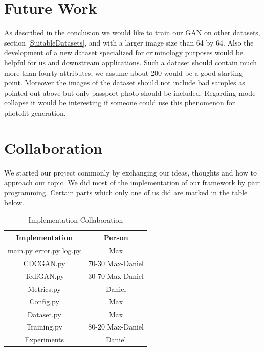 \documentclass[12pt, a4paper]{article}
\begin{document}
\section{Future Work}
As described in the conclusion we would like to train our GAN on other datasets, section \ref{SuitableDatasets}, and with a larger image size than 64 by 64. 
Also the development of a new dataset specialized for criminology purposes would be helpful for us and downstream applications.
Such a dataset should contain much more than fourty attributes, we assume about 200 would be a good starting point. Moreover the images of the dataset should not include bad samples as pointed out above but only passport photo should be included.
Regarding mode collapse it would be interesting if someone could use this phenomenon for photofit generation.
\section{Collaboration}
We started our project commonly by exchanging our ideas, thoughts and how to approach our topic.
We did most of the implementation of our framework by pair programming. Certain parts which only one of us did are marked in the table below.
\begin{table}[h]
\centering
    \begin{tabular}{|c|c|}
        \hline
        Implementation & Person \\        
        \hline
        main.py error.py log.py & Max\\
        CDCGAN.py & 70-30 Max-Daniel\\
        TediGAN.py & 30-70 Max-Daniel\\
        Metrics.py & Daniel\\
        Config.py & Max\\
        Dataset.py & Max\\
        Training.py & 80-20 Max-Daniel\\
        Experiments & Daniel\\
        \hline
    \end{tabular} 
    \caption{Implementation Collaboration}
\end{table}
\end{document}
